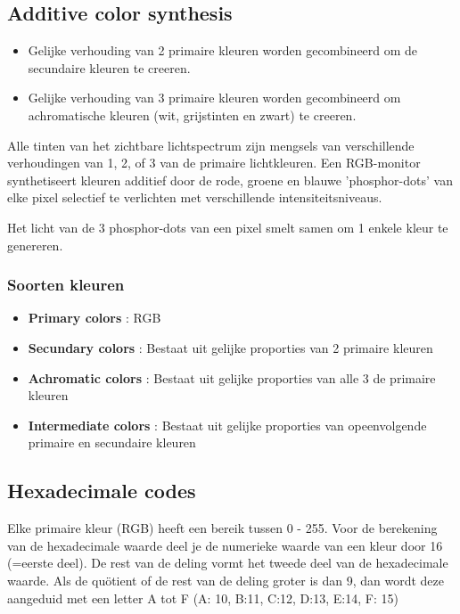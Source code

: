\documentclass{article}
\newcommand{\bold}[1]{\textbf{#1}}
\begin{document}
\subsection{Additive color synthesis}
\begin{itemize}
    \item Gelijke verhouding van 2 primaire kleuren worden gecombineerd om de secundaire kleuren te creeren.
    \item Gelijke verhouding van 3 primaire kleuren worden gecombineerd om achromatische kleuren (wit, grijstinten en zwart) te creeren. 
\end{itemize}
Alle tinten van het zichtbare lichtspectrum zijn mengsels van verschillende verhoudingen van 1, 2, of 3 van de primaire lichtkleuren.
Een RGB-monitor synthetiseert kleuren additief door de rode, groene en blauwe 'phosphor-dots' van elke pixel selectief te verlichten met verschillende intensiteitsniveaus.

Het licht van de 3 phosphor-dots van een pixel smelt samen om 1 enkele kleur te genereren.


\subsubsection{Soorten kleuren}
\begin{itemize}
    \item \bold{Primary colors} : RGB
    \item \bold{Secundary colors} : Bestaat uit gelijke proporties van 2 primaire kleuren
    \item \bold{Achromatic colors} : Bestaat uit gelijke proporties van alle 3 de primaire kleuren
    \item \bold{Intermediate colors} : Bestaat uit gelijke proporties van opeenvolgende primaire en secundaire kleuren
\end{itemize}

\subsection{Hexadecimale codes}
Elke primaire kleur (RGB) heeft een bereik tussen 0 - 255. 
Voor de berekening van de hexadecimale waarde deel je de numerieke waarde van een kleur door 16 (=eerste deel).
De rest van de deling vormt het tweede deel van de hexadecimale waarde. 
Als de quötient of de rest van de deling groter is dan 9, dan wordt deze aangeduid met een letter A tot F (A: 10, B:11, C:12, D:13, E:14, F: 15)
\end{document}
